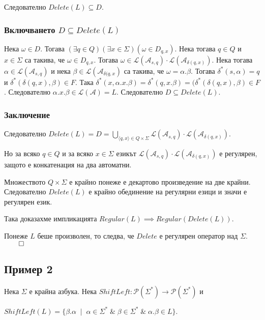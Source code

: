 \documentclass[12pt]{article}
\begin{document}
Следователно \(Delete(L) \subseteq D\).

\subsubsection*{Включването \(D \subseteq Delete(L)\)}
Нека \(\omega \in D\). Тогава \((\exists q \in Q)(\exists x \in \Sigma)(\omega \in D_{q, x})\).
Нека тогава \(q \in Q\) и \(x \in \Sigma\) са такива, че \(\omega \in D_{q, x}\).
Тогава \(\omega \in \mathcal{L}(\mathcal{A}_{s, q}) \cdot \mathcal{L}(\mathcal{A}_{\delta(q, x)})\).
Нека тогава \(\alpha \in \mathcal{L}(\mathcal{A}_{s, q})\) и нека \(\beta \in \mathcal{L}(\mathcal{A}_{\delta(q, x})\)
са такива, че \(\omega = \alpha.\beta\). Тогава
\(\delta^*(s, \alpha) = q\) и \(\delta^*(\delta(q, x), \beta) \in F\).
Така \(\delta^*(x, \alpha.x.\beta) = \delta^*(q, x.\beta) = (\delta^*(\delta(q, x), \beta) \in F\).
Следователно \(\alpha.x.\beta \in \mathcal{L}(\mathcal{A}) = L\).
Следователно  \(D \subseteq Delete(L)\).

\subsubsection*{Заключение}
Следователно \(Delete(L) = D = \displaystyle\bigcup_{\langle q, x \rangle \in Q \times \Sigma} \mathcal{L}(\mathcal{A}_{s, q}) \cdot \mathcal{L}(\mathcal{A}_{\delta(q, x)})\).

Но за всяко \(q \in Q\) и за всяко \(x \in \Sigma\) езикът \(\mathcal{L}(\mathcal{A}_{s, q}) \cdot \mathcal{L}(\mathcal{A}_{\delta(q, x)})\) е регулярен, защото е конкатенация на два автоматни.

Множеството \(Q \times \Sigma\) е крайно понеже е декартово произведение на две крайни.
Следователно \(Delete(L)\) е крайно обединение на регулярни езици и значи е регулярен език.

Така доказахме импликацията \(Regular(L) \implies Regular(Delete(L))\).

Понеже \(L\) беше произволен, то следва, че \(Delete\) е регулярен оператор над \(\Sigma\). \(\qed\)

\subsection*{Пример 2}
Нека \(\Sigma\) е крайна азбука.
Нека \(ShiftLeft : \mathcal{P}(\Sigma^*) \to \mathcal{P}(\Sigma^*)\) и

\(ShiftLeft(L) = \{\beta.\alpha \;\mid\; \alpha \in \Sigma^* \;\&\; \beta \in \Sigma^* \;\&\; \alpha.\beta \in L\}\).
\end{document}
